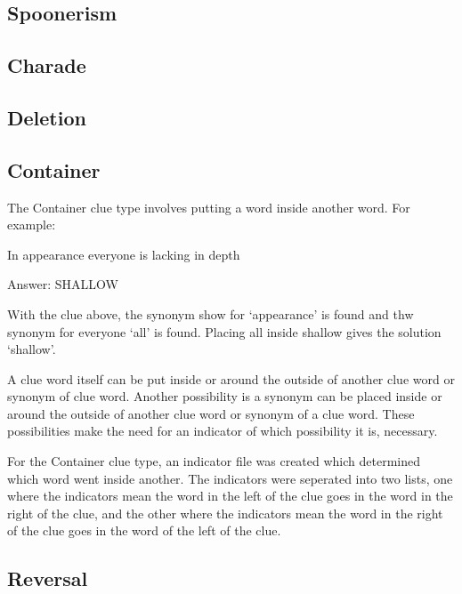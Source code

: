 \subsection{Spoonerism}

\subsection{Charade}

\subsection{Deletion}

\subsection{Container}

The Container clue type involves putting a word inside another word.
 For example: 

In appearance everyone is lacking in depth

Answer: SHALLOW

With the clue above, the synonym show for `appearance' is found 
and thw synonym for everyone `all' is found. Placing all inside shallow 
gives the solution `shallow'. 

A clue word itself can be put inside or around the outside of another clue 
word or synonym of clue word. Another possibility is a synonym can be 
placed inside or around the outside of another clue word or synonym of 
a clue word. These possibilities make the need for an indicator of which 
possibility it is, necessary. 

For the Container clue type, an indicator file was created which determined 
which word went inside another. The indicators were seperated into two 
lists, one where the indicators mean the word in the left of the clue goes in 
the word in the right of the clue, and the other where the indicators mean 
the word in the right of the clue goes in the word of the left of the clue. 
 

\subsection{Reversal}

